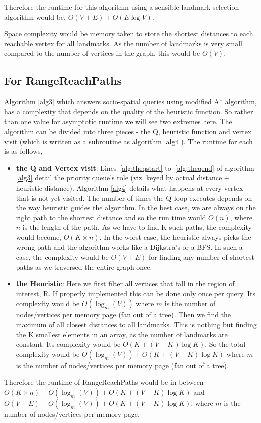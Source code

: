 Therefore the runtime for this algorithm using a sensible landmark selection algorithm would be, $O(V + E) + O(E\log V)$.

Space complexity would be memory taken to store the shortest distances to each reachable vertex for all landmarks. As the number of landmarks is very small compared to the number of vertices in the graph, this would be $O(V)$.

\subsection{For RangeReachPaths}
Algorithm \ref{alg3} which answers socio-spatial queries using modified A* algorithm, has a complexity that depends on the quality of the heuristic function. So rather than one value for asymptotic runtime we will see two extremes here. The algorithm can be divided into three pieces - the Q, heuristic function and vertex visit (which is written as a subroutine as algorithm \ref{alg4}). The runtime for each is as follows,

\begin{itemize}

	\item \textbf{the Q and Vertex visit}: Lines~\ref{alg:theqstart} to~\ref{alg:theqend} of algorithm \ref{alg3} detail the priority queue's role (viz. keyed by actual distance + heuristic distance). Algorithm \ref{alg4} details what happens at every vertex that is not yet visited. The number of times the Q loop executes depends on the way heuristic guides the algorithm. In the best case, we are always on the right path to the shortest distance and so the run time would $O(n)$, where $n$ is the length of the path. As we have to find K such paths, the complexity would become, $O(K \times n)$. In the worst case, the heuristic always picks the wrong path and the algorithm works like a Dijkstra's or a BFS. In such a case, the complexity would be $O(V + E)$ for finding any number of shortest paths as we traversed the entire graph once.

	\item \textbf{the Heuristic}: Here we first filter all vertices that fall in the region of interest, R. If properly implemented this can be done only once per query. Its complexity would be $O(\log_m (V))$ where $m$ is the number of nodes/vertices per memory page (fan out of a tree). Then we find the maximum of all closest distances to all landmarks. This is nothing but finding the K smallest elements in an array, as the number of landmarks are constant. Its complexity would be $O(K + (V-K)\log K)$. So the total complexity would be $O(\log_m (V)) + O(K + (V-K)\log K)$ where $m$ is the number of nodes/vertices per memory page (fan out of a tree).
\end{itemize}


Therefore the runtime of RangeReachPaths would be in between $O(K \times n) + O(\log_m (V)) + O(K + (V-K)\log K)$ and $O(V + E) + O(\log_m (V)) + O(K + (V-K)\log K)$, where $m$ is the number of nodes/vertices per memory page.
